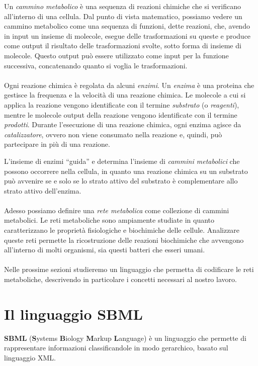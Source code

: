Un \emph{cammino metabolico} \`e una sequenza di reazioni chimiche che
si verificano all'interno di una cellula. Dal punto di vista
matematico, possiamo vedere un cammino metabolico come una sequenza di
funzioni, dette reazioni, che, avendo in input un insieme di molecole,
esegue delle trasformazioni su queste e produce come output il
risultato delle trasformazioni svolte, sotto forma di insieme di
molecole. Questo output pu\`o essere utilizzato come input per la
funzione successiva, concatenando quanto si voglia le trasformazioni.
\\\\
Ogni reazione chimica \`e regolata da alcuni \emph{enzimi}. Un
\emph{enzima} \`e una proteina che gestisce la frequenza e la
velocit\`a di una reazione chimica. Le molecole a cui si applica la
reazione vengono identificate con il termine \emph{substrato} (o
\emph{reagenti}), mentre le molecole output della reazione vengono
identificate con il termine \emph{prodotti}.  Durante l'esecuzione di
una reazione chimica, ogni enzima agisce da \emph{catalizzatore},
ovvero non viene consumato nella reazione e, quindi, pu\`o partecipare
in pi\`u di una reazione.

L'insieme di enzimi ``guida'' e determina l'insieme di \emph{cammini
  metabolici} che possono occorrere nella cellula, in quanto una
reazione chimica su un substrato pu\`o avvenire se e solo se lo strato
attivo del substrato \`e complementare allo strato attivo dell'enzima.
\\\\
Adesso possiamo definire una \emph{rete metabolica} come collezione di
cammini metabolici. Le reti metaboliche sono ampiamente studiate in
quanto caratterizzano le propriet\`a fisiologiche e biochimiche delle
cellule. Analizzare queste reti permette la ricostruzione delle
reazioni biochimiche che avvengono all'interno di molti organismi, sia
questi batteri che esseri umani.
\\\\
Nelle prossime sezioni studieremo un linguaggio che permetta di
codificare le reti metaboliche, descrivendo in particolare i concetti
necessari al nostro lavoro.

\section{Il linguaggio SBML}
\textbf{SBML} (\textbf{S}ystems \textbf{B}iology \textbf{M}arkup
\textbf{L}anguage) \`e un linguaggio che permette di rappresentare
informazioni classificandole in modo gerarchico, basato sul linguaggio
XML.

